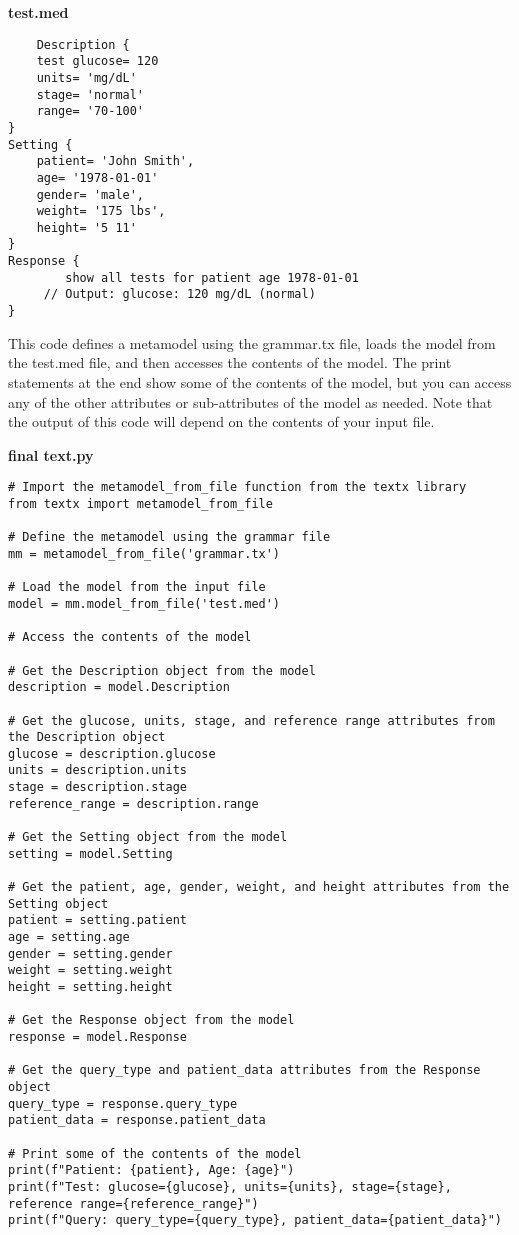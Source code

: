\textbf{test.med}
\begin{lstlisting}
    Description { 
	test glucose= 120 
	units= 'mg/dL' 
	stage= 'normal' 
	range= '70-100'
}
Setting {
	patient= 'John Smith', 
	age= '1978-01-01'
	gender= 'male',
	weight= '175 lbs',
	height= '5 11'
}
Response {
    	show all tests for patient age 1978-01-01
   	 // Output: glucose: 120 mg/dL (normal)
}
\end{lstlisting}

This code defines a metamodel using the grammar.tx file, loads the model from the test.med file, and then accesses the contents of the model. The print statements at the end show some of the contents of the model, but you can access any of the other attributes or sub-attributes of the model as needed. Note that the output of this code will depend on the contents of your input file.

\textbf{final text.py}
\begin{lstlisting}
# Import the metamodel_from_file function from the textx library
from textx import metamodel_from_file

# Define the metamodel using the grammar file
mm = metamodel_from_file('grammar.tx')

# Load the model from the input file
model = mm.model_from_file('test.med')

# Access the contents of the model

# Get the Description object from the model
description = model.Description

# Get the glucose, units, stage, and reference range attributes from the Description object
glucose = description.glucose
units = description.units
stage = description.stage
reference_range = description.range

# Get the Setting object from the model
setting = model.Setting

# Get the patient, age, gender, weight, and height attributes from the Setting object
patient = setting.patient
age = setting.age
gender = setting.gender
weight = setting.weight
height = setting.height

# Get the Response object from the model
response = model.Response

# Get the query_type and patient_data attributes from the Response object
query_type = response.query_type
patient_data = response.patient_data

# Print some of the contents of the model
print(f"Patient: {patient}, Age: {age}")
print(f"Test: glucose={glucose}, units={units}, stage={stage}, reference range={reference_range}")
print(f"Query: query_type={query_type}, patient_data={patient_data}")
\end{lstlisting}

